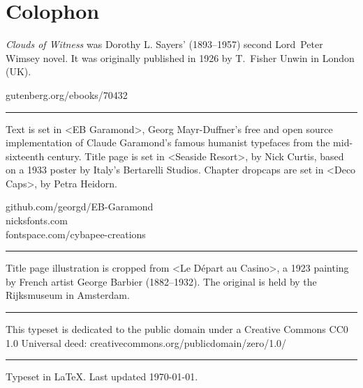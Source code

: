 \documentclass[
paper=5.5in:8.5in,
]{scrbook} %
\begin{document}
\mainmatter
\pagestyle{headings}
\renewcommand*{\chapterpagestyle}{plain}






















\renewcommand*{\chapterheadendvskip}{\vspace{10pt}}
\renewcommand*{\chapterheadstartvskip}{\vspace{0pt}}

\clearpage
{}
\chapter*{Colophon}
\centering
\vfill
\begin{minipage}{\textwidth}
\textit{Clouds of Witness} was Dorothy L. Sayers' (1893--1957) second Lord~Peter Wimsey novel. It was originally published in 1926 by T.~Fisher Unwin in London (UK).
\end{minipage}
\vfill
gutenberg.org/ebooks/70432
\vfill
\rule{0.5\textwidth}{.4pt}
\vfill
\begin{minipage}{\textwidth}
Text is set in <EB Garamond>, Georg Mayr-Duffner's free and open source implementation of Claude Garamond’s famous humanist typefaces from the mid-sixteenth century. Title page is set in <Seaside Resort>, by Nick Curtis, based on a 1933 poster by Italy’s Bertarelli Studios. Chapter dropcaps are set in <Deco Caps>, by Petra Heidorn.
\end{minipage}
\vfill
github.com/georgd/EB-Garamond\\
nicksfonts.com\\
fontspace.com/cybapee-creations
\vfill
\rule{0.5\textwidth}{.4pt}
\vfill
\begin{minipage}{\textwidth}
Title page illustration is cropped from <Le Départ au Casino>, a 1923 painting by French artist George Barbier (1882--1932). The original is held by the Rijksmuseum in Amsterdam.
\end{minipage}
\vfill
\rule{0.5\textwidth}{.4pt}
\vfill
\begin{minipage}{\textwidth}
This typeset is dedicated to the public domain under a Creative Commons CC0 1.0 Universal deed: creativecommons.org/publicdomain/zero/1.0/
\end{minipage}
\vfill
\rule{0.5\textwidth}{.4pt}
\vfill
Typeset in \LaTeX{}. Last updated \today.

\thispagestyle{empty}
\end{document}
